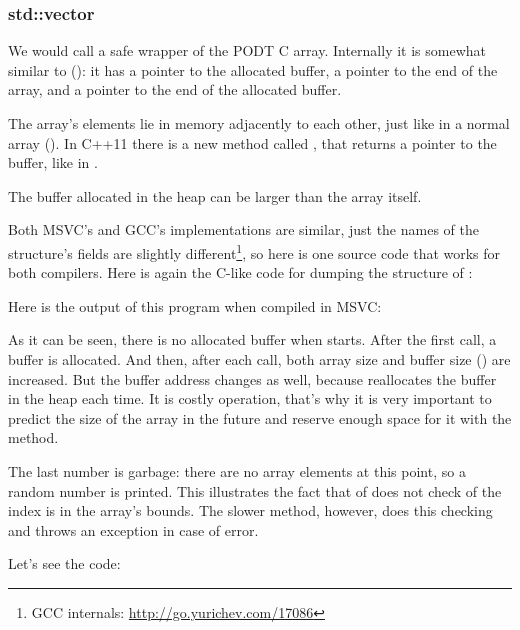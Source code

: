\subsubsection{std::vector}

We would call  a safe wrapper of the \ac{PODT} C array.
Internally it is somewhat similar to  ():
it has a pointer to the allocated buffer, a pointer to the end of the array, and a pointer to the end of the allocated buffer.

The array's elements  lie in memory adjacently to each other, just like in a normal array ().
In C++11 there is a new method called  , that returns a pointer to the buffer, like  in .

The buffer allocated in the \gls{heap} can be larger than the array itself.

Both MSVC's and GCC's implementations are similar, just the names of the structure's fields are slightly different\footnote
{GCC internals: \url{http://go.yurichev.com/17086}}, so here is one source
code that works for both compilers.
Here is again the C-like code for dumping the structure of :



Here is the output of this program when compiled in MSVC:



As it can be seen, there is no allocated buffer when \main starts.
After the first  call, a buffer is allocated.
And then, after each  
call, both array size and buffer size () are increased.
But the buffer address changes as well, because  
reallocates the buffer in the \gls{heap} each time.
It is costly operation, that's why it is very important to predict the size of the array in the future and reserve 
enough space for it with the  method.

The last number is garbage: there are no array elements at this point, so a random number is printed.
This illustrates the fact that  of 
 does not check of the index is in the array's bounds.
The slower  
method, however, does this checking and throws an  
exception in case of error.

Let's see the code:


